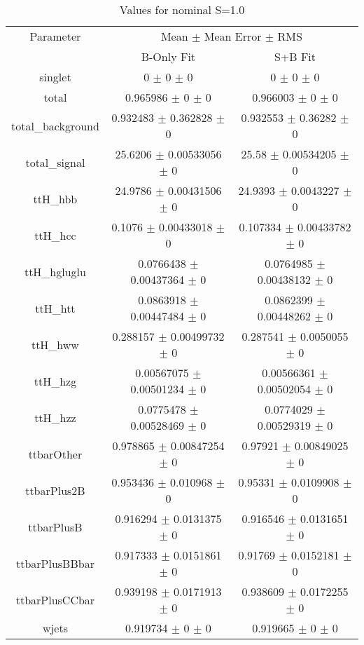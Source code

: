\begin{table}
\centering
\caption{Values for nominal S=1.0}
\begin{tabular}{ccc}
\toprule
Parameter & \multicolumn{2}{c}{Mean $\pm$ Mean Error $\pm$ RMS}\\
 & B-Only Fit & S+B Fit\\
\midrule
singlet & \num{0} $\pm$ \num{0} $\pm$ \num{0} & \num{0} $\pm$ \num{0} $\pm$ \num{0}\\
total & \num{0.965986} $\pm$ \num{0} $\pm$ \num{0} & \num{0.966003} $\pm$ \num{0} $\pm$ \num{0}\\
total\_background & \num{0.932483} $\pm$ \num{0.362828} $\pm$ \num{0} & \num{0.932553} $\pm$ \num{0.36282} $\pm$ \num{0}\\
total\_signal & \num{25.6206} $\pm$ \num{0.00533056} $\pm$ \num{0} & \num{25.58} $\pm$ \num{0.00534205} $\pm$ \num{0}\\
ttH\_hbb & \num{24.9786} $\pm$ \num{0.00431506} $\pm$ \num{0} & \num{24.9393} $\pm$ \num{0.0043227} $\pm$ \num{0}\\
ttH\_hcc & \num{0.1076} $\pm$ \num{0.00433018} $\pm$ \num{0} & \num{0.107334} $\pm$ \num{0.00433782} $\pm$ \num{0}\\
ttH\_hgluglu & \num{0.0766438} $\pm$ \num{0.00437364} $\pm$ \num{0} & \num{0.0764985} $\pm$ \num{0.00438132} $\pm$ \num{0}\\
ttH\_htt & \num{0.0863918} $\pm$ \num{0.00447484} $\pm$ \num{0} & \num{0.0862399} $\pm$ \num{0.00448262} $\pm$ \num{0}\\
ttH\_hww & \num{0.288157} $\pm$ \num{0.00499732} $\pm$ \num{0} & \num{0.287541} $\pm$ \num{0.0050055} $\pm$ \num{0}\\
ttH\_hzg & \num{0.00567075} $\pm$ \num{0.00501234} $\pm$ \num{0} & \num{0.00566361} $\pm$ \num{0.00502054} $\pm$ \num{0}\\
ttH\_hzz & \num{0.0775478} $\pm$ \num{0.00528469} $\pm$ \num{0} & \num{0.0774029} $\pm$ \num{0.00529319} $\pm$ \num{0}\\
ttbarOther & \num{0.978865} $\pm$ \num{0.00847254} $\pm$ \num{0} & \num{0.97921} $\pm$ \num{0.00849025} $\pm$ \num{0}\\
ttbarPlus2B & \num{0.953436} $\pm$ \num{0.010968} $\pm$ \num{0} & \num{0.95331} $\pm$ \num{0.0109908} $\pm$ \num{0}\\
ttbarPlusB & \num{0.916294} $\pm$ \num{0.0131375} $\pm$ \num{0} & \num{0.916546} $\pm$ \num{0.0131651} $\pm$ \num{0}\\
ttbarPlusBBbar & \num{0.917333} $\pm$ \num{0.0151861} $\pm$ \num{0} & \num{0.91769} $\pm$ \num{0.0152181} $\pm$ \num{0}\\
ttbarPlusCCbar & \num{0.939198} $\pm$ \num{0.0171913} $\pm$ \num{0} & \num{0.938609} $\pm$ \num{0.0172255} $\pm$ \num{0}\\
wjets & \num{0.919734} $\pm$ \num{0} $\pm$ \num{0} & \num{0.919665} $\pm$ \num{0} $\pm$ \num{0}\\
\bottomrule
\end{tabular}
\end{table}